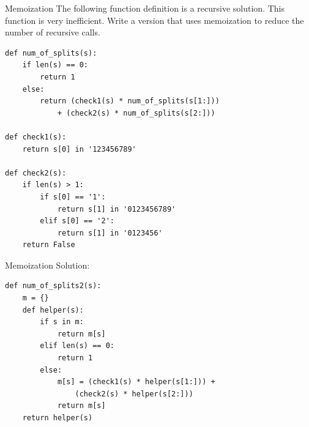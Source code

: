 \documentclass[9pt]{beamer}
\begin{document}
\begin{frame}[fragile]{Memoization}
  The following function definition is a recursive solution. This function
  is very inefficient. Write a version that uses memoization to reduce the
  number of recursive calls.

  \begin{lstlisting}
def num_of_splits(s):
    if len(s) == 0:
        return 1
    else:
        return (check1(s) * num_of_splits(s[1:]))
            + (check2(s) * num_of_splits(s[2:]))

def check1(s):
    return s[0] in '123456789'

def check2(s):
    if len(s) > 1:
        if s[0] == '1':
            return s[1] in '0123456789'
        elif s[0] == '2':
            return s[1] in '0123456'
    return False
  \end{lstlisting}
\end{frame}

\begin{frame}[fragile]{Memoization}
  Solution:

  \begin{lstlisting}
def num_of_splits2(s):
    m = {}
    def helper(s):
        if s in m:
            return m[s]
        elif len(s) == 0:
            return 1
        else:
            m[s] = (check1(s) * helper(s[1:])) +
                (check2(s) * helper(s[2:]))
            return m[s]
    return helper(s)
  \end{lstlisting}
\end{frame}
\end{document}
